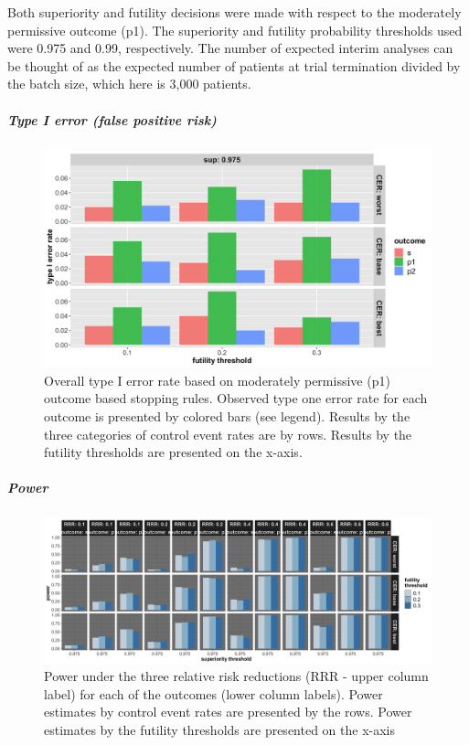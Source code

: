 \documentclass[]{article}
\let\oldsubparagraph\subparagraph
\renewcommand{\subparagraph}[1]{\oldsubparagraph{#1}\mbox{}}
\begin{document}
Both superiority and futility decisions were made with respect to the
moderately permissive outcome (p1). The superiority and futility
probability thresholds used were 0.975 and 0.99, respectively. The
number of expected interim analyses can be thought of as the expected
number of patients at trial termination divided by the batch size, which
here is 3,000 patients.

\hypertarget{type-i-error-false-positive-risk-2}{%
\subparagraph{Type I error (false positive
risk)}\label{type-i-error-false-positive-risk-2}}

\begin{figure}
  \caption{Overall type I error rate based on moderately permissive (p1) outcome based stopping rules. Observed type one error rate for each outcome is
  presented by colored bars (see legend). Results by the three categories of control event rates are by rows. Results by the futility thresholds are
  presented on the x-axis.}
  \includegraphics{../p1_plots/batch_size_nb_3000/type_1_error_p1.png}
\end{figure}

\clearpage

\hypertarget{power-2}{%
\subparagraph{Power}\label{power-2}}

\begin{figure}
  \caption{Power under the three relative risk reductions (RRR - upper column label) for each of the outcomes (lower column labels). 
  Power estimates by control event rates are presented by the rows. Power estimates by the futility thresholds are presented on the x-axis}
  \includegraphics{../p1_plots/batch_size_nb_3000/power_all_p1.png}
\end{figure}
\end{document}
